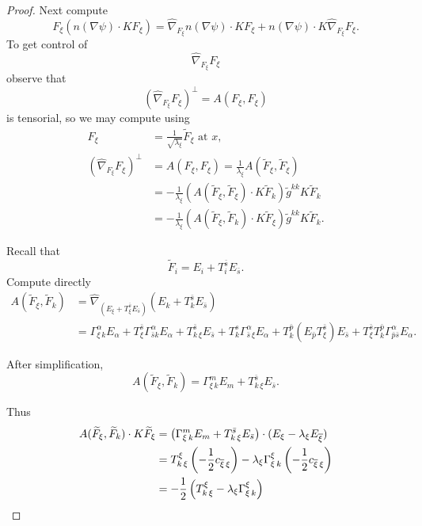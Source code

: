 \documentclass[12pt,letterpaper]{amsart}%
\numberwithin{mycounter}{section}
\theoremstyle{plain}
\numberwithin{equation}{section}
\theoremstyle{definition}
\newcommand{\maxidx}{\mathord{\xi}} %
\begin{document}
\begin{proof}
Next compute 
\begin{equation}
F_{\maxidx}\left(  n\left(  \nabla\psi\right)  \cdot KF_{\maxidx}\right)
=\hat{\nabla}_{F_{\maxidx}} n\left(  \nabla\psi\right)  \cdot K F_{\maxidx}
+ n\left(  \nabla\psi\right)\cdot K\hat{\nabla}_{F_{\maxidx}}F_{\maxidx}.
\label{thisone}
\end{equation}
To get control of
\[
\hat{\nabla}_{F_{\maxidx}}F_{\maxidx}
\]
observe that
\begin{equation}
\left(  \hat{\nabla}_{F_{\maxidx}}F_{\maxidx}\right)  ^{\perp}=A(F_{\maxidx},F_{\maxidx}) \label{seethe}
\end{equation}
is tensorial, so we may compute using
\begin{align*}
F_{\maxidx} &=\frac{1}{\sqrt{\lambda_{\maxidx}}}\widetilde{F}_{\maxidx}\text{ at }x,\\
\left(  \hat{\nabla}_{F_{\maxidx}}F_{\maxidx}\right)  ^{\perp}
&=A(F_{\maxidx},F_{\maxidx})=\frac{1}{\lambda_{\maxidx}}A(\widetilde{F}_{\maxidx},\widetilde{F}_{\maxidx})\\
&=-\frac{1}{\lambda_{\maxidx}}\left(  A(\widetilde{F}_{\maxidx},\widetilde{F}_{\maxidx})\cdot
K\widetilde{F}_{k}\right)  \widetilde{g}^{kk}K\widetilde{F}_{k}\\
&=- \frac{1}{\lambda_{\maxidx}}\left(  A(\widetilde{F}_{\maxidx},\widetilde{F}_{k})\cdot
K\widetilde{F}_{\maxidx}\right)  \widetilde{g}^{kk}K\widetilde{F}_{k}.
\end{align*}

Recall that
\[
\widetilde{F}_{i}=E_{i}+T_{i}^{\bar{s}}E_{\bar{s}}.
\]
Compute directly
\begin{align*}
A(\widetilde{F}_{\maxidx},\widetilde{F}_{k})
&=\hat{\nabla}_{\left(  E_{\maxidx}+T_{\maxidx}^{\bar{s}}E_{\bar{s}}\right)}
\left(  E_{k}+T_{k}^{\bar{s}}E_{\bar{s}}\right) \\
&=\Gamma_{\maxidx\,k}^{\alpha}E_{\alpha}
  +T_{\maxidx}^{\bar{s}}\Gamma_{\bar{s}k}^{\alpha}E_{\alpha}
  +T_{k\,\maxidx}^{\bar{s}}E_{\bar{s}}
  +T_{k}^{s}\Gamma_{\bar{s}\,\maxidx}^{\alpha}E_{\alpha}
  +T_{k}^{\bar{p}}(E_{\bar{p}}T_{\maxidx}^{\bar{s}})E_{\bar{s}}
  +T_{\maxidx}^{\bar{s}}T_{k}^{\bar{p}}\Gamma_{\bar{p}\bar{s}}^{\alpha}E_{\alpha}.
\end{align*}

After simplification,
\[
A(\widetilde{F}_{\maxidx},\widetilde{F}_{k})
=\Gamma_{\maxidx\,k}^{m}E_{m}+T_{k\,\maxidx}^{\bar{s}}E_{\bar{s}}.
\]

Thus
\begin{align}
A(\widetilde{F}_{\maxidx},\widetilde{F}_{k})\cdot K\widetilde{F}_{\maxidx}
&=\left(
\Gamma_{\maxidx\,k}^{m}E_{m}+T_{k\,\maxidx}^{\bar{s}}E_{\bar{s}}
\right)\cdot(E_{\maxidx}-\lambda_{\maxidx}E_{\overline{\maxidx}}) \notag\\
&=T_{k\,\maxidx}^{\maxidx}\left(-\frac12 c_{\overline{\maxidx}\,\maxidx}\right)
  -\lambda_{\maxidx}\Gamma_{\maxidx\,k}^{\maxidx}\left(-\frac12 c_{\overline{\maxidx}\,\maxidx}\right) \notag\\
&=-\frac12\left(T_{k\,\maxidx}^{\maxidx}
   -\lambda_{\maxidx}\Gamma_{\maxidx\,k}^{\maxidx}\right)
\label{cope}
\end{align}


\end{proof}
\end{document}
